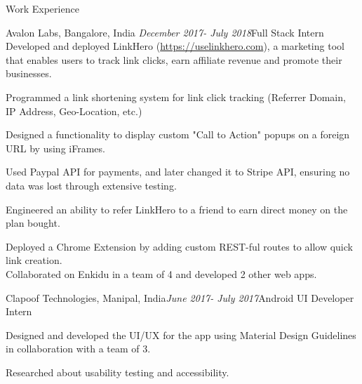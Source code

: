 \documentclass{resume} %
\begin{document}
\begin{rSection}{Work Experience}

    \begin{rSubsection}{Avalon Labs, Bangalore, India }{\em December 2017- July 2018}{Full Stack Intern}{}
    Developed and deployed LinkHero (\url{https://uselinkhero.com}), a marketing tool that enables users to track link clicks, earn affiliate revenue and promote their businesses.
    \item
    Programmed a link shortening system for link click tracking (Referrer Domain, IP Address, Geo-Location, etc.)
    \item 
    Designed a functionality to display custom "Call to Action" popups on a foreign URL by using iFrames.
    \item 
    Used Paypal API for payments, and later changed it to Stripe API, ensuring no data was lost through extensive testing.
    \item 
    Engineered an ability to refer LinkHero to a friend to earn direct money on the plan bought. 
    \item
    Deployed a Chrome Extension by adding custom REST-ful routes to allow quick link creation.\\
    Collaborated on Enkidu in a team of 4 and developed 2 other web apps.
    \end{rSubsection}
    \begin{rSubsection}{Clapoof Technologies, Manipal, India}{\em June 2017- July 2017}{Android UI Developer Intern}{}
    \item Designed and developed the UI/UX for the app using Material Design Guidelines in collaboration with a team of 3.
    \item Researched about usability testing and accessibility.
    \end{rSubsection}
\end{rSection}
\end{document}
